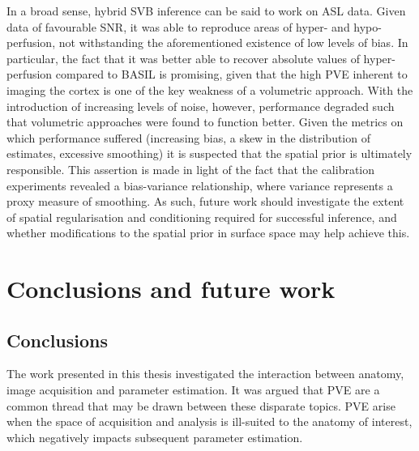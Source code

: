 \documentclass[12pt]{report}
\providecommand{\DIFdelbegin}{} %
\providecommand{\DIFdelend}{} %
\newcommand{\DIFscaledelfig}{0.5}
\newlength{\DIFdelgraphicswidth} %
\newlength{\DIFdelgraphicsheight} %
\newcommand{\DIFdelincludegraphics}[2][]{%
\sbox{\DIFdelgraphicsbox}{\DIFOincludegraphics[#1]{#2}}%
\settoboxwidth{\DIFdelgraphicswidth}{\DIFdelgraphicsbox} %
\settoboxtotalheight{\DIFdelgraphicsheight}{\DIFdelgraphicsbox} %
\scalebox{\DIFscaledelfig}{%
\parbox[b]{\DIFdelgraphicswidth}{\usebox{\DIFdelgraphicsbox}\\[-\baselineskip] \rule{\DIFdelgraphicswidth}{0em}}\llap{\resizebox{\DIFdelgraphicswidth}{\DIFdelgraphicsheight}{%
\setlength{\unitlength}{\DIFdelgraphicswidth}%
\begin{picture}(1,1)%
\thicklines\linethickness{2pt} %
{\color[rgb]{1,0,0}\put(0,0){\framebox(1,1){}}}%
{\color[rgb]{1,0,0}\put(0,0){\line( 1,1){1}}}%
{\color[rgb]{1,0,0}\put(0,1){\line(1,-1){1}}}%
\end{picture}%
}\hspace*{3pt}}} %
} %
\DeclareRobustCommand{\DIFdelbegin}{\DIFOdelbegin \let\includegraphics\DIFdelincludegraphics} %
\DeclareRobustCommand{\DIFdelend}{\DIFOaddend \let\includegraphics\DIFOincludegraphics} %
\begin{document}
In a broad sense, hybrid SVB inference can be said to work on ASL data. Given data of favourable SNR, it was able to reproduce areas of hyper- and hypo-perfusion, not withstanding the aforementioned existence of low levels of bias. In particular, the fact that it was better able to recover absolute values of hyper-perfusion compared to BASIL is promising, given that the high PVE inherent to imaging the cortex is one of the key weakness of a volumetric approach. With the introduction of increasing levels of noise, however, performance degraded such that volumetric approaches were found to function better. Given the metrics on which performance suffered (increasing bias, a skew in the distribution of estimates, excessive smoothing) it is suspected that the spatial prior is ultimately responsible. This assertion is made in light of the fact that the calibration experiments revealed a bias-variance relationship, where variance represents a proxy measure of smoothing. As such, future work should investigate the extent of spatial regularisation and conditioning required for successful inference, and whether modifications to the spatial prior in surface space may help achieve this. 
 \DIFdelbegin %

\DIFdelend \newpage 
 \newpage %


\chapter{Conclusions and future work}
\label{future_work_chapter}

\section{Conclusions}

The work presented in this thesis investigated the interaction between anatomy, image acquisition and parameter estimation. It was argued that PVE are a common thread that may be drawn between these disparate topics. PVE arise when the space of acquisition and analysis is ill-suited to the anatomy of interest, which negatively impacts subsequent parameter estimation. 
\end{document}
